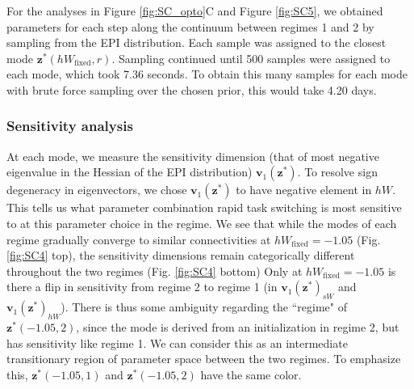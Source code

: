 \documentclass[11pt]{article}
\begin{document}
For the analyses in Figure \ref{fig:SC_opto}C and Figure \ref{fig:SC5}, we obtained parameters for each step along the continuum between regimes 1 and 2 by sampling from the EPI distribution.
Each sample was assigned to the closest mode $\mathbf{z}^*(hW_{\text{fixed}}, r)$.
Sampling continued until 500 samples were assigned to each mode, which took 7.36 seconds.
To obtain this many samples for each mode with brute force sampling over the chosen prior, this would take 4.20 days.

\subsubsection{Sensitivity analysis} \label{methods_sc_hessian}
At each mode, we measure the sensitivity dimension (that of most negative eigenvalue in the Hessian of the EPI distribution) $\mathbf{v}_1(\mathbf{z}^*)$.
To resolve sign degeneracy in eigenvectors, we chose $\mathbf{v}_1(\mathbf{z}^*)$ to have negative element in $hW$.
This tells us what parameter combination rapid task switching is most sensitive to at this parameter choice in the regime.
We see that while the modes of each regime gradually converge to similar connectivities at $hW_{\text{fixed}} = -1.05$ (Fig. \ref{fig:SC4} top), the sensitivity dimensions remain categorically different throughout the two regimes (Fig. \ref{fig:SC4} bottom)
Only at $hW_{\text{fixed}} = -1.05$ is there a flip in sensitivity from regime 2 to regime 1 (in $\mathbf{v}_1(\mathbf{z}^*)_{sW}$ and $\mathbf{v}_1(\mathbf{z}^*)_{hW}$).
There is thus some ambiguity regarding the ``regime" of $\mathbf{z}^*(-1.05, 2)$, since the mode is derived from an initialization in regime 2, but has sensitivity like regime 1.
We can consider this as an intermediate transitionary region of parameter space between the two regimes.
To emphasize this, $\mathbf{z}^*(-1.05, 1)$ and $\mathbf{z}^*(-1.05, 2)$ have the same color.
\end{document}
